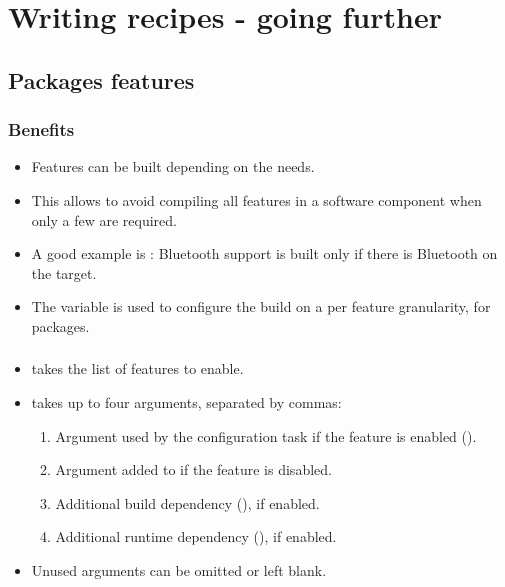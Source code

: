 \section{Writing recipes - going further}

\subsection{Packages features}

\begin{frame}
  \frametitle{Benefits}
  \begin{itemize}
    \item Features can be built depending on the needs.
    \item This allows to avoid compiling all features in a software
      component when only a few are required.
    \item A good example is : Bluetooth support
      is built only if there is Bluetooth on the target.
    \item The  variable is used to configure the
      build on a per feature granularity, for packages.
  \end{itemize}
\end{frame}

\begin{frame}
  \frametitle{}
  \begin{itemize}
    \item {} takes the list of features to enable.
    \item {} takes up to four arguments,
      separated by commas:
      \begin{enumerate}
        \item Argument used by the configuration task if the feature
          is enabled ().
        \item Argument added to  if the feature is
          disabled.
        \item Additional build dependency (), if enabled.
        \item Additional runtime dependency (), if enabled.
      \end{enumerate}
    \item Unused arguments can be omitted or left blank.
  \end{itemize}
\end{frame}

